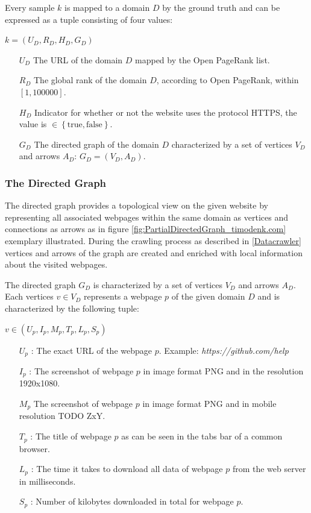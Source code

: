 Every sample $k$ is mapped to a domain $D$ by the ground truth and can be expressed as a tuple consisting of four values:

\begin{center}
$k = (U_D,R_D,H_D,G_D)$
\begin{itemize}
	\item[$U_D$] The URL of the domain $D$ mapped by the Open PageRank list.
	\item[$R_D$] The global rank of the domain $D$, according to Open PageRank, within $[1, 100000]$. 
    \item[$H_D$] Indicator for whether or not the website uses the protocol HTTPS, the value is $\in\left\{\text{true}, \text{false}\right\}$.
    \item[$G_D$] The directed graph of the domain $D$ characterized by a set of vertices $V_D$ and arrows $A_D$: $G_D= (V_D, A_D)$.
\end{itemize}
\end{center}

\subsubsection{The Directed Graph}
The directed graph provides a topological view on the given website by representing all associated webpages within the same domain as vertices and connections as arrows as in figure \ref{fig:PartialDirectedGraph_timodenk.com} exemplary illustrated. During the crawling process as described in \ref{Datacrawler} vertices and arrows of the graph are created and enriched with local information about the visited webpages.

The directed graph $G_D$ is characterized by a set of vertices $V_D$ and arrows $A_D$. Each vertices $v \in V_D$ represents a webpage $p$ of the given domain $D$ and is characterized by the following tuple:

\begin{center}
	$v \in (U_p, I_p, M_p,T_p, L_p, S_p)$
\begin{itemize}
	\item[$ U_p$] : The exact URL of the webpage $p$. Example: \textit{https://github.com/help}
	\item[$I_p$] : The screenshot of webpage $p$ in image format PNG and in the resolution 1920x1080.
	\item[$M_p$] The screenshot of webpage $p$ in image format PNG and in mobile resolution TODO ZxY.
	\item[$T_p$] : The title of webpage $p$ as can be seen in the tabs bar of a common browser.
	\item[$L_p$] : The time it takes to download all data of webpage $p$ from the web server in milliseconds.
	\item[$S_p$] : Number of kilobytes downloaded in total for webpage $p$.
\end{itemize}
\end{center}

